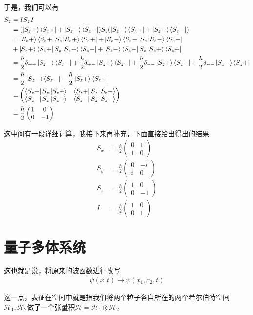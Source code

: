 \documentclass{article}
\newcommand{\pmtwo}[4]{\begin{pmatrix}#1&#2\\#3&#4\end{pmatrix}}
\begin{document}
于是，我们可以有
\begin{align*}
    S_z&=IS_zI\\
    &=(\ket{S_z+}\bra{S_z+}+\ket{S_z-}\bra{S_z-})S_z(\ket{S_z+}\bra{S_z+}+\ket{S_z-}\bra{S_z-})\\
    &=\ket{S_z+}\bra{S_z+}S_z\ket{S_z+}\bra{S_z+}+\ket{S_z-}\bra{S_z-}S_z\ket{S_z-}\bra{S_z-}\\
    &+\ket{S_z+}\bra{S_z+}S_z\ket{S_z-}\bra{S_z-}+\ket{S_z-}\bra{S_z-}S_z\ket{S_z+}\bra{S_z+}\\
    &=\frac{\hbar}{2}\delta_{++}\ket{S_z-}\bra{S_z-}+\frac{\hbar}{2}\delta_{+-}\ket{S_z+}\bra{S_z-}+\frac{\hbar}{2}\delta_{--}\ket{S_z+}\bra{S_z+}+\frac{\hbar}{2}\delta_{-+}\ket{S_z-}\bra{S_z+}\\
    &=\frac{\hbar}{2}\ket{S_z-}\bra{S_z-}-\frac{\hbar}{2}\ket{S_z+}\bra{S_z+}\\
    &=\pmtwo{\bra{S_z+}S_z\ket{S_z+}}{\bra{S_z+}S_z\ket{S_z-}}{\bra{S_z-}S_z\ket{S_z+}}{\bra{S_z-}S_z\ket{S_z-}}\\
    &=\frac{\hbar}{2}\pmtwo{1}{0}{0}{-1}
\end{align*}

这中间有一段详细计算，我接下来再补充，下面直接给出得出的结果
\begin{align*}
    S_x&=\frac{\hbar}{2}\pmtwo{0}{1}{1}{0}\\
    S_y&=\frac{\hbar}{2}\pmtwo{0}{-i}{i}{0}\\
    S_z&=\frac{\hbar}{2}\pmtwo{1}{0}{0}{-1}\\
    I&=\frac{\hbar}{2}\pmtwo{1}{0}{0}{1}
\end{align*}


\section{量子多体系统}
这也就是说，将原来的波函数进行改写
\begin{align*}
    \psi(x,t)\longrightarrow \psi(x_1,x_2,t)
\end{align*}

这一点，表征在空间中就是指我们将两个粒子各自所在的两个希尔伯特空间$\mathcal{H}_1,\mathcal{H}_2$做了一个张量积$\mathcal{H}=\mathcal{H}_1\otimes \mathcal{H}_2$
\end{document}
